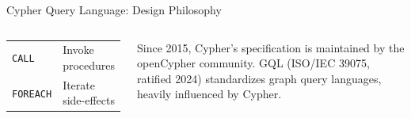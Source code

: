 \documentclass[aspectratio=169]{beamer}
\begin{document}
\begin{frame}{Cypher Query Language: Design Philosophy}
\begin{columns}[T]
\begin{tcolorbox}[infobox, title=Core Cypher Clauses]
\begin{tabular}{@{}ll@{}}
          \texttt{CALL} & Invoke procedures \\
          \texttt{FOREACH} & Iterate side-effects \\
        \end{tabular}
      \end{tcolorbox}
      \vspace{0.2cm}
      \begin{tcolorbox}[deepdivebox, title=openCypher Standard]
        \scriptsize
        Since 2015, Cypher's specification is maintained by the openCypher community. GQL (ISO/IEC 39075, ratified 2024) standardizes graph query languages, heavily influenced by Cypher.
      \end{tcolorbox}
  \end{columns}
\end{frame}
\end{document}
